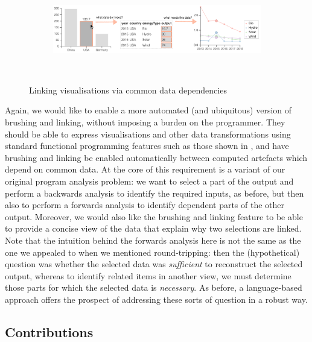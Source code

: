 \begin{figure}
  \begin{subfigure}[b]{0.99\textwidth}
     \centering
     {\includegraphics[scale=0.58]{fig/example/vis-linking.png}}
  \end{subfigure}\\[2mm]
  \begin{subfigure}{0.8\textwidth}
     \small
     
  \end{subfigure}
 \caption{Linking visualisations via common data dependencies}
 \label{fig:introduction:vis-linking}
\end{figure}

Again, we would like to enable a more automated (and ubiquitous) version of brushing and linking, without imposing a burden on the programmer. They should be able to express visualisations and other data transformations using standard functional programming features such as those shown in , and have brushing and linking be enabled automatically between computed artefacts which depend on common data. At the core of this requirement is a variant of our original program analysis problem: we want to select a part of the output and perform a backwards analysis to identify the required inputs, as before, but then also to perform a forwards analysis to identify dependent parts of the other output. Moreover, we would also like the brushing and linking feature to be able to provide a concise view of the data that explain why two selections are linked. Note that the intuition behind the forwards analysis here is not the same as the one we appealed to when we mentioned round-tripping: then the (hypothetical) question was whether the selected data was \emph{sufficient} to reconstruct the selected output, whereas to identify related items in another view, we must determine those parts for which the selected data is \emph{necessary}. As before, a language-based approach offers the prospect of addressing these sorts of question in a robust way.

\subsection{Contributions}

